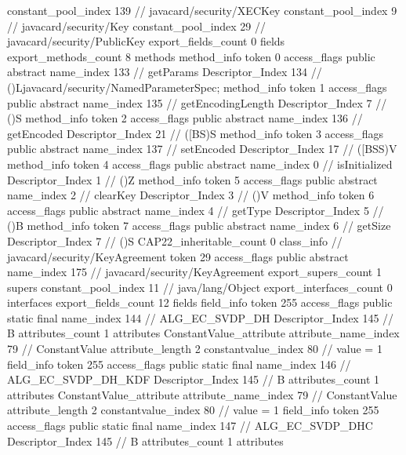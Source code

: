 {{{{				constant_pool_index	139		// javacard/security/XECKey
				constant_pool_index	9		// javacard/security/Key
				constant_pool_index	29		// javacard/security/PublicKey
			}
			export_fields_count	0
			fields {
			}
			export_methods_count	8
			methods {
				method_info {
					token	0
					access_flags	public abstract
					name_index	133		// getParams
					Descriptor_Index	134		// ()Ljavacard/security/NamedParameterSpec;
				}
				method_info {
					token	1
					access_flags	public abstract
					name_index	135		// getEncodingLength
					Descriptor_Index	7		// ()S
				}
				method_info {
					token	2
					access_flags	public abstract
					name_index	136		// getEncoded
					Descriptor_Index	21		// ([BS)S
				}
				method_info {
					token	3
					access_flags	public abstract
					name_index	137		// setEncoded
					Descriptor_Index	17		// ([BSS)V
				}
				method_info {
					token	4
					access_flags	public abstract
					name_index	0		// isInitialized
					Descriptor_Index	1		// ()Z
				}
				method_info {
					token	5
					access_flags	public abstract
					name_index	2		// clearKey
					Descriptor_Index	3		// ()V
				}
				method_info {
					token	6
					access_flags	public abstract
					name_index	4		// getType
					Descriptor_Index	5		// ()B
				}
				method_info {
					token	7
					access_flags	public abstract
					name_index	6		// getSize
					Descriptor_Index	7		// ()S
				}
			}
			CAP22_inheritable_count	0
		}
		class_info {		// javacard/security/KeyAgreement
			token	29
			access_flags	public abstract
			name_index	175		// javacard/security/KeyAgreement
			export_supers_count	1
			supers {
				constant_pool_index	11		// java/lang/Object
			}
			export_interfaces_count	0
			interfaces {
			}
			export_fields_count	12
			fields {
			field_info {
				token	255
				access_flags	public static final
				name_index	144		// ALG_EC_SVDP_DH
				Descriptor_Index	145		// B
				attributes_count	1
				attributes {
				ConstantValue_attribute {
					attribute_name_index	79		// ConstantValue
					attribute_length	2
					constantvalue_index	80		// value = 1
				}
				}
			}
			field_info {
				token	255
				access_flags	public static final
				name_index	146		// ALG_EC_SVDP_DH_KDF
				Descriptor_Index	145		// B
				attributes_count	1
				attributes {
				ConstantValue_attribute {
					attribute_name_index	79		// ConstantValue
					attribute_length	2
					constantvalue_index	80		// value = 1
				}
				}
			}
			field_info {
				token	255
				access_flags	public static final
				name_index	147		// ALG_EC_SVDP_DHC
				Descriptor_Index	145		// B
				attributes_count	1
				attributes {
}}}}}}
